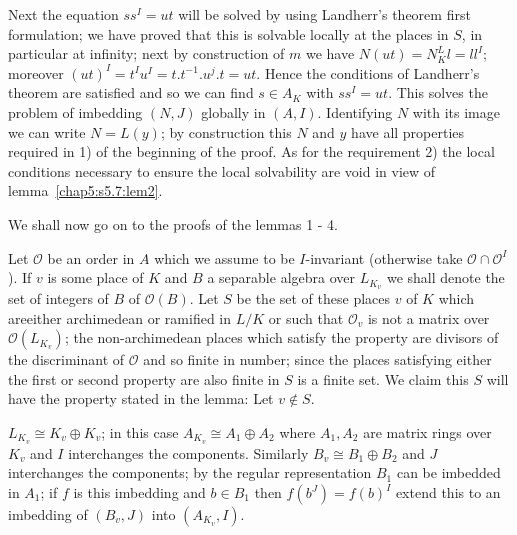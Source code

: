 Next the equation $ss^I = ut$ will be solved by using Landherr's
theorem first formulation; we have proved that this is solvable
locally at the places in $S$, in particular at infinity; next by
construction of $m$ we have $N(ut)= N^L_K l = ll ^I$; moreover
$(ut)^I = t^I u^I = t.t^{-1}. u^j.t = ut$. Hence the conditions of
Landherr's theorem are satisfied and so we can find $s \in A_K$ with
$ss^I = ut$. This solves the problem of imbedding $(N, J)$ globally in
$(A,I)$. Identifying $N$ with its image we can write $N = L(y)$; by
construction this $N$ and $y$ have all properties required in 1) of
the beginning of the proof. As for the requirement 2) the local
conditions necessary to ensure the local solvability are void in view
of lemma~\ref{chap5:s5.7:lem2}. 

We shall now go on to the proofs of the lemmas 1 - 4.

\setcounter{proofoflem}{0}
\begin{proofoflem}%
Let $\mathscr{O}$ be an order in $A$ which we assume to be $I$-invariant
(otherwise take $\mathscr{O} \cap \mathscr{O}^I$). If $v$ is some
place of $K$ and  $B$ a separable algebra over $L_{K_v}$ we shall
denote the set of integers of $B$ of $\mathscr{O}(B)$. Let $S$ be the
set of these places $v$ of $K$ which are\pageoriginale either
archimedean or 
ramified in $L/K$ or such that $\mathscr{O}_v$ is not a matrix over
$\mathscr{O}(L_{K_v})$; the non-archimedean places which satisfy the
property are divisors of the discriminant of $\mathscr{O}$ and so
finite in number; since the places satisfying either the first or
second property are also finite in $S$ is a finite  set. We claim this
$S$ will have the property stated in the lemma: Let $v \notin S$. 
 \end{proofoflem} 


\setcounter{romancase}{0}
 \begin{romancase}%
$L_{K_v} \cong K_v \oplus K_v$; in this case $A_{K_v} \cong A_1 \oplus
   A_2$ where $A_1, A_2$ are matrix rings over $K_v$ and $I$
   interchanges the components. Similarly $B_v \cong B_1 \oplus B_2$
   and $J$ interchanges the components; by the regular representation
   $B_1$ can be imbedded in $A_1$; if $f$ is this imbedding and $b\in
   B_1$ then $f(b^J) = f(b)^I$ extend this to an imbedding of $(B_v,
   J)$ into $(A_{K_v}, I)$. 
 \end{romancase} 

